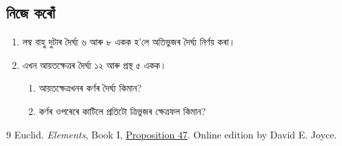 \documentclass[11pt,a4paper]{article}
\begin{document}
\subsection{নিজে কৰোঁ}
\begin{enumerate}
  \item লম্ব বাহু দুটাৰ দৈৰ্ঘ্য ৬ আৰু ৮ একক হ'লে অতিভুজৰ দৈৰ্ঘ্য নিৰ্ণয় কৰা।
  \item এখন আয়তক্ষেত্ৰৰ দৈৰ্ঘ্য ১২ আৰু প্ৰস্থ ৫ একক।
    \begin{enumerate}
      \item আয়তক্ষেত্ৰখনৰ কৰ্ণৰ দৈৰ্ঘ্য কিমান?
      \item কৰ্ণৰ ওপৰেৰে কাটিলে প্ৰতিটো ত্ৰিভুজৰ ক্ষেত্ৰফল কিমান?
    \end{enumerate}
\end{enumerate}

\begin{thebibliography}{9}
   Euclid. \textit{Elements}, Book I,
  \href{https://mathcs.clarku.edu/~djoyce/elements/bookI/propI47.html}{Proposition 47}.
  Online edition by David E. Joyce.
\end{thebibliography}
\end{document}
